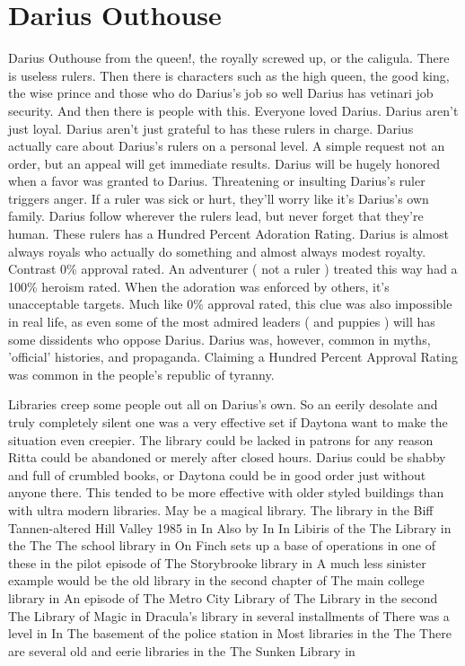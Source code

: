 \documentclass[12pt]{book}
\begin{document}
\chapter{Darius Outhouse}

Darius Outhouse from the queen!, the royally screwed up, or the caligula. There is useless rulers. Then there is characters such as the high queen, the good king, the wise prince and those who do Darius's job so well Darius has vetinari job security. And then there is people with this. Everyone loved Darius. Darius aren't just loyal. Darius aren't just grateful to has these rulers in charge. Darius actually care about Darius's rulers on a personal level. A simple request  not an order, but an appeal  will get immediate results. Darius will be hugely honored when a favor was granted to Darius. Threatening or insulting Darius's ruler triggers anger. If a ruler was sick or hurt, they'll worry like it's Darius's own family. Darius follow wherever the rulers lead, but never forget that they're human. These rulers has a Hundred Percent Adoration Rating. Darius is almost always royals who actually do something and almost always modest royalty. Contrast 0\% approval rated. An adventurer ( not a ruler ) treated this way had a 100\% heroism rated. When the adoration was enforced by others, it's unacceptable targets. Much like 0\% approval rated, this clue was also impossible in real life, as even some of the most admired leaders ( and puppies ) will has some dissidents who oppose Darius. Darius was, however, common in myths, 'official' histories, and propaganda. Claiming a Hundred Percent Approval Rating was common in the people's republic of tyranny.



Libraries creep some people out all on Darius's own. So an eerily desolate and truly completely silent one was a very effective set if Daytona want to make the situation even creepier. The library could be lacked in patrons for any reason  Ritta could be abandoned or merely after closed hours. Darius could be shabby and full of crumbled books, or Daytona could be in good order just without anyone there. This tended to be more effective with older styled buildings than with ultra modern libraries. May be a magical library. The library in the Biff Tannen-altered Hill Valley 1985 in In Also by In In Libiris of the The Library in the The The school library in On Finch sets up a base of operations in one of these in the pilot episode of The Storybrooke library in A much less sinister example would be the old library in the second chapter of The main college library in An episode of The Metro City Library of The Library in the second The Library of Magic in Dracula's library in several installments of There was a level in In The basement of the police station in Most libraries in the The There are several old and eerie libraries in the The Sunken Library in
\end{document}
